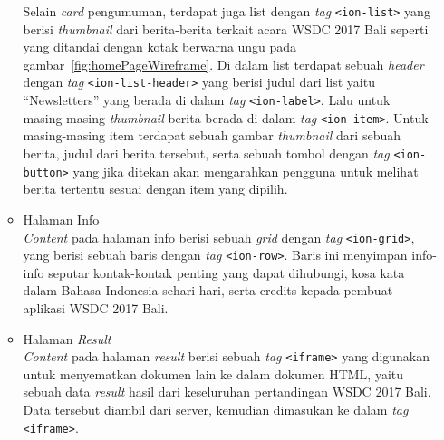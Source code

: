 \begin{enumerate}
\begin{itemize}
					Selain \textit{card} pengumuman, terdapat juga list dengan \textit{tag} \texttt{<ion-list>} yang berisi \textit{thumbnail} dari berita-berita terkait acara WSDC 2017 Bali seperti yang ditandai dengan kotak berwarna ungu pada gambar~\ref{fig:homePageWireframe}. Di dalam list terdapat sebuah \textit{header} dengan \textit{tag} \texttt{<ion-list-header>} yang berisi judul dari list yaitu ``Newsletters'' yang berada di dalam \textit{tag} \texttt{<ion-label>}. Lalu untuk masing-masing \textit{thumbnail} berita berada di dalam \textit{tag} \texttt{<ion-item>}. Untuk masing-masing item terdapat sebuah gambar \textit{thumbnail} dari sebuah berita, judul dari berita tersebut, serta sebuah tombol dengan \textit{tag} \texttt{<ion-button>} yang jika ditekan akan mengarahkan pengguna untuk melihat berita tertentu sesuai dengan item yang dipilih.
				
				\item Halaman Info \\
					\textit{Content} pada halaman info berisi sebuah \textit{grid} dengan \textit{tag} \texttt{<ion-grid>}, yang berisi sebuah baris dengan \textit{tag} \texttt{<ion-row>}. Baris ini menyimpan info-info seputar kontak-kontak penting yang dapat dihubungi, kosa kata dalam Bahasa Indonesia sehari-hari, serta credits kepada pembuat aplikasi WSDC 2017 Bali.
					
				\item Halaman \textit{Result}\\
					\textit{Content} pada halaman \textit{result} berisi sebuah \textit{tag} \texttt{<iframe>} yang digunakan untuk menyematkan dokumen lain ke dalam dokumen HTML, yaitu sebuah data \textit{result} hasil dari keseluruhan pertandingan WSDC 2017 Bali. Data tersebut diambil dari server, kemudian dimasukan ke dalam \textit{tag} \texttt{<iframe>}. 
					

\end{itemize}
\end{enumerate}
